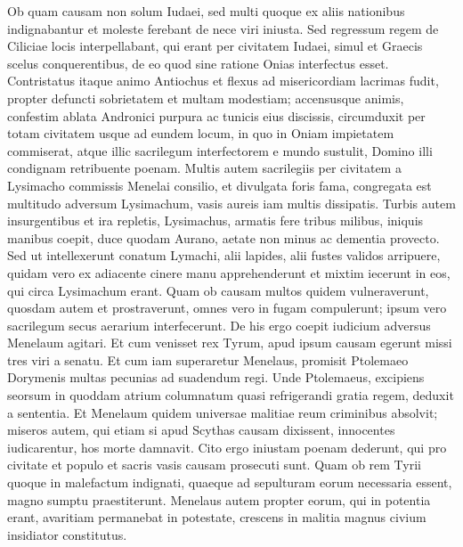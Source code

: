 \begin{biblechapter}
\verse Ob quam causam non solum Iudaei, sed multi quoque ex aliis nationibus indignabantur et moleste ferebant de nece viri iniusta. 
\verse Sed regressum regem de Ciliciae locis interpellabant, qui erant per civitatem Iudaei, simul et Graecis scelus conquerentibus, de eo quod sine ratione Onias interfectus esset. 
\verse Contristatus itaque animo Antiochus et flexus ad misericordiam lacrimas fudit, propter defuncti sobrietatem et multam modestiam; 
\verse accensusque animis, confestim ablata Andronici purpura ac tunicis eius discissis, circumduxit per totam civitatem usque ad eundem locum, in quo in Oniam impietatem commiserat, atque illic sacrilegum interfectorem e mundo sustulit, Domino illi condignam retribuente poenam. 
\verse Multis autem sacrilegiis per civitatem a Lysimacho commissis Menelai consilio, et divulgata foris fama, congregata est multitudo adversum Lysimachum, vasis aureis iam multis dissipatis. 
\verse Turbis autem insurgentibus et ira repletis, Lysimachus, armatis fere tribus milibus, iniquis manibus coepit, duce quodam Aurano, aetate non minus ac dementia provecto. 
\verse Sed ut intellexerunt conatum Lymachi, alii lapides, alii fustes validos arripuere, quidam vero ex adiacente cinere manu apprehenderunt et mixtim iecerunt in eos, qui circa Lysimachum erant. 
\verse Quam ob causam multos quidem vulneraverunt, quosdam autem et prostraverunt, omnes vero in fugam compulerunt; ipsum vero sacrilegum secus aerarium interfecerunt. 
\verse De his ergo coepit iudicium adversus Menelaum agitari. 
\verse Et cum venisset rex Tyrum, apud ipsum causam egerunt missi tres viri a senatu. 
\verse Et cum iam superaretur Menelaus, promisit Ptolemaeo Dorymenis multas pecunias ad suadendum regi. 
\verse Unde Ptolemaeus, excipiens seorsum in quoddam atrium columnatum quasi refrigerandi gratia regem, deduxit a sententia. 
\verse Et Menelaum quidem universae malitiae reum criminibus absolvit; miseros autem, qui etiam si apud Scythas causam dixissent, innocentes iudicarentur, hos morte damnavit. 
\verse Cito ergo iniustam poenam dederunt, qui pro civitate et populo et sacris vasis causam prosecuti sunt. 
\verse Quam ob rem Tyrii quoque in malefactum indignati, quaeque ad sepulturam eorum necessaria essent, magno sumptu praestiterunt.  
\verse Menelaus autem propter eorum, qui in potentia erant, avaritiam permanebat in potestate, crescens in malitia magnus civium insidiator constitutus. 
\end{biblechapter}

